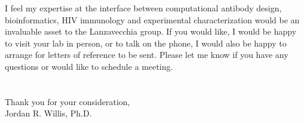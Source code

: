 \begin{newlfm}
I feel my expertise at the interface between computational antibody design, bioinformatics, HIV immunology and experimental characterization would be an invaluable asset to the Lanzavecchia group.  If you would like, I would be happy to visit your lab in person, or to talk on the phone, I would also be happy to arrange for letters of reference to be sent. Please let me know if you have any questions or would like to schedule a meeting.
\\
\\ \\
Thank you for your consideration,\\
Jordan R. Willis, Ph.D.
\end{newlfm}

